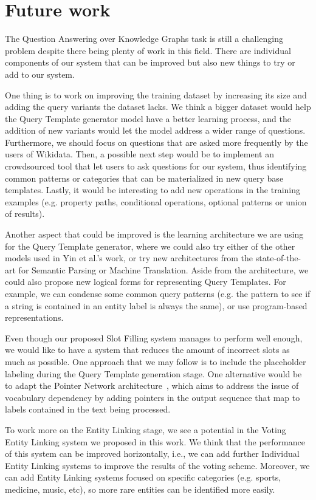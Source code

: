 \section{Future work}
\label{cap6:conclusions/futureWork}
The Question Answering over Knowledge Graphs task is still a challenging problem despite there being 
plenty of work in this field. There are individual components of our system that can be improved but 
also new things to try or add to our system.

One thing is to work on improving the training dataset by increasing its size and adding the \SPARQL{} 
query variants the \LCQuADtwo{} dataset lacks. We think a bigger dataset would help the Query Template 
generator model have a better learning process, and the addition of new variants would let the model 
address a wider range of questions. Furthermore, we should focus on questions that are asked more 
frequently by the users of Wikidata. Then, a possible next step would be to implement an crowdsourced 
tool that let users to ask questions for our system, thus identifying common patterns or categories 
that can be materialized in new query base templates. Lastly, it would be interesting to add new 
operations in the training examples (e.g. property paths, conditional operations, optional patterns 
or union of results).

Another aspect that could be improved is the learning architecture we are using for the Query 
Template generator, where we could also try either of the other models used in Yin et al.'s work, or 
try new architectures from the state-of-the-art for Semantic Parsing or Machine Translation. Aside 
from the architecture, we could also propose new logical forms for representing Query Templates. For 
example, we can condense some common query patterns (e.g. the pattern to see if a string is contained 
in an entity label is always the same), or use program-based representations. 

Even though our proposed Slot Filling system manages to perform well enough, we would like to have a 
system that reduces the amount of incorrect slots as much as possible. One approach that we may 
follow is to include the placeholder labeling during the Query Template generation stage. One 
alternative would be to adapt the Pointer Network architecture~\cite{key:vinyals2015pointer}, which 
aims to address the issue of vocabulary dependency by adding pointers in the output sequence that 
map to labels contained in the text being processed.

To work more on the Entity Linking stage, we see a potential in the Voting Entity Linking system we 
proposed in this work. We think that the performance of this system can be improved horizontally, 
i.e., we can add further Individual Entity Linking systems to improve the results of the voting scheme. 
Moreover, we can add Entity Linking systems focused on specific categories (e.g. sports, medicine, 
music, etc), so more rare entities can be identified more easily.

